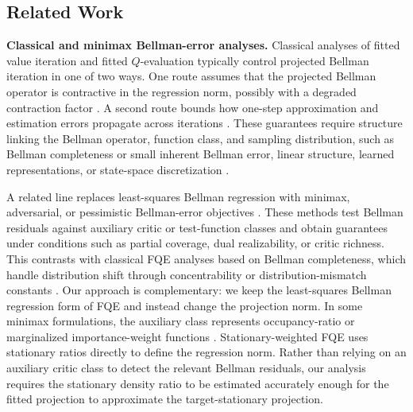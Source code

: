 \documentclass{article}
\theoremstyle{plain}
\theoremstyle{definition}
\theoremstyle{remark}
\begin{document}
\subsection{Related Work}

\textbf{Classical and minimax Bellman-error analyses.}
Classical analyses of fitted value iteration and fitted \(Q\)-evaluation
typically control projected Bellman iteration in one of two ways. One route
assumes that the projected Bellman operator is contractive in the regression
norm, possibly with a degraded contraction factor
\citep{gordon1995stable,tsitsiklis1996analysis,bertsekas2011approximate}. A
second route bounds how one-step approximation and estimation errors propagate
across iterations
\citep{munos2008finite,scherrer2014approximate}. These guarantees require
structure linking the Bellman operator, function class, and sampling
distribution, such as Bellman completeness or small inherent Bellman error,
linear structure, learned representations, or state-space discretization
\citep{melo2007convergence,duan2020minimax,yang2020reinforcement,
jin2023provably,chang2022learning,peng1993convergence,van2006performance,
xie2021batch}.

A related line replaces least-squares Bellman regression with minimax,
adversarial, or pessimistic Bellman-error objectives
\citep{uehara2020minimax,xie2020q,imaizumi2021minimax,jin2021bellman,
di2023pessimistic,amortila2024harnessing}. These methods test Bellman residuals
against auxiliary critic or test-function classes and obtain guarantees under
conditions such as partial coverage, dual realizability, or critic richness.
This contrasts with classical FQE analyses based on Bellman completeness, which
handle distribution shift through concentrability or distribution-mismatch
constants
\citep{munos2008finite,scherrer2014approximate,fan2020theoretical,xie2022role}.
Our approach is complementary: we keep the least-squares Bellman regression form
of FQE and instead change the projection norm. In some minimax formulations, the
auxiliary class represents occupancy-ratio or marginalized importance-weight
functions \citep{uehara2020minimax,xie2020q,uehara2023offline}.
Stationary-weighted FQE uses stationary ratios directly to define the regression
norm. Rather than relying on an auxiliary critic class to detect the relevant
Bellman residuals, our analysis requires the stationary density ratio to be
estimated accurately enough for the fitted projection to approximate the
target-stationary projection.
\end{document}
